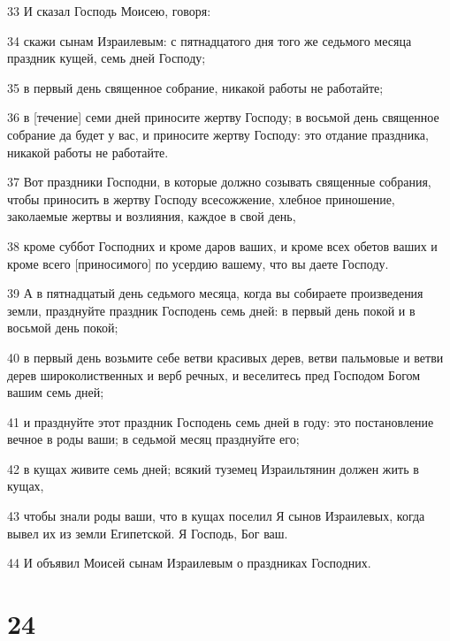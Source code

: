 \par 33 И сказал Господь Моисею, говоря:
\par 34 скажи сынам Израилевым: с пятнадцатого дня того же седьмого месяца праздник кущей, семь дней Господу;
\par 35 в первый день священное собрание, никакой работы не работайте;
\par 36 в [течение] семи дней приносите жертву Господу; в восьмой день священное собрание да будет у вас, и приносите жертву Господу: это отдание праздника, никакой работы не работайте.
\par 37 Вот праздники Господни, в которые должно созывать священные собрания, чтобы приносить в жертву Господу всесожжение, хлебное приношение, заколаемые жертвы и возлияния, каждое в свой день,
\par 38 кроме суббот Господних и кроме даров ваших, и кроме всех обетов ваших и кроме всего [приносимого] по усердию вашему, что вы даете Господу.
\par 39 А в пятнадцатый день седьмого месяца, когда вы собираете произведения земли, празднуйте праздник Господень семь дней: в первый день покой и в восьмой день покой;
\par 40 в первый день возьмите себе ветви красивых дерев, ветви пальмовые и ветви дерев широколиственных и верб речных, и веселитесь пред Господом Богом вашим семь дней;
\par 41 и празднуйте этот праздник Господень семь дней в году: это постановление вечное в роды ваши; в седьмой месяц празднуйте его;
\par 42 в кущах живите семь дней; всякий туземец Израильтянин должен жить в кущах,
\par 43 чтобы знали роды ваши, что в кущах поселил Я сынов Израилевых, когда вывел их из земли Египетской. Я Господь, Бог ваш.
\par 44 И объявил Моисей сынам Израилевым о праздниках Господних.

\chapter{24}

